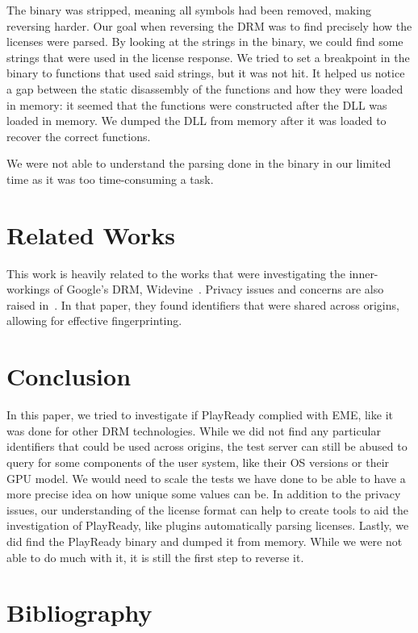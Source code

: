 \documentclass[11pt, a4paper]{IEEEtran}
\begin{document}
The binary was stripped, meaning all symbols had been removed, making reversing harder. Our goal when reversing the DRM was to find precisely how the licenses were parsed. By looking at the strings in the binary, we could find some strings that were used in the license response. We tried to set a breakpoint in the binary to functions that used said strings, but it was not hit. It helped us notice a gap between the static disassembly of the functions and how they were loaded in memory: it seemed that the functions were constructed after the DLL was loaded in memory. We dumped the DLL from memory after it was loaded to recover the correct functions.

We were not able to understand the parsing done in the binary in our limited time as it was too time-consuming a task.


\section{Related Works}

This work is heavily related to the works that were investigating the inner-workings of Google's DRM, Widevine~\cite{wideleak,widevinefunandprofit}. Privacy issues and concerns are also raised in~\cite{drmcanwatchyoutoo}. In that paper, they found identifiers that were shared across origins, allowing for effective fingerprinting.



\section{Conclusion}

In this paper, we tried to investigate if PlayReady complied with EME, like it was done for other DRM technologies. While we did not find any particular identifiers that could be used across origins, the test server can still be abused to query for some components of the user system, like their OS versions or their GPU model. We would need to scale the tests we have done to be able to have a more precise idea on how unique some values can be. In addition to the privacy issues, our understanding of the license format can help to create tools to aid the investigation of PlayReady, like plugins automatically parsing licenses. Lastly, we did find the PlayReady binary and dumped it from memory. While we were not able to do much with it, it is still the first step to reverse it.


\section*{Bibliography}
\printbibliography
\end{document}
